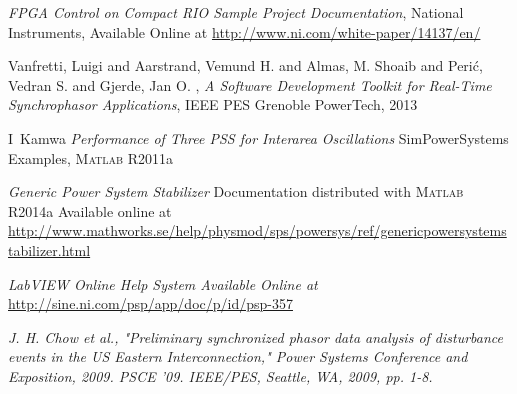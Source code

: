 \documentclass[journal]{IEEEtran}
\begin{document}
\begin{thebibliography}{1}
 \emph{FPGA Control on Compact RIO Sample Project Documentation}, National Instruments, Available Online at \url{http://www.ni.com/white-paper/14137/en/}

 Vanfretti, Luigi and Aarstrand, Vemund H. and Almas, M. Shoaib and Peri\'c, Vedran S. and Gjerde, Jan O. , \emph{A Software Development Toolkit for Real-Time Synchrophasor Applications},  IEEE PES Grenoble PowerTech, 2013

 I~Kamwa \emph{Performance of Three PSS for Interarea Oscillations} SimPowerSystems Examples, \textsc{Matlab} R2011a

 \emph{Generic Power System Stabilizer} Documentation distributed with \textsc{Matlab} R2014a Available online at \url{http://www.mathworks.se/help/physmod/sps/powersys/ref/genericpowersystemstabilizer.html}

 \emph{LabVIEW Online Help System Available Online at} \url{http://sine.ni.com/psp/app/doc/p/id/psp-357}

\emph{J. H. Chow et al., "Preliminary synchronized phasor data analysis of disturbance events in the US Eastern Interconnection," Power Systems Conference and Exposition, 2009. PSCE '09. IEEE/PES, Seattle, WA, 2009, pp. 1-8.}



\end{thebibliography}

% 
\end{document}
